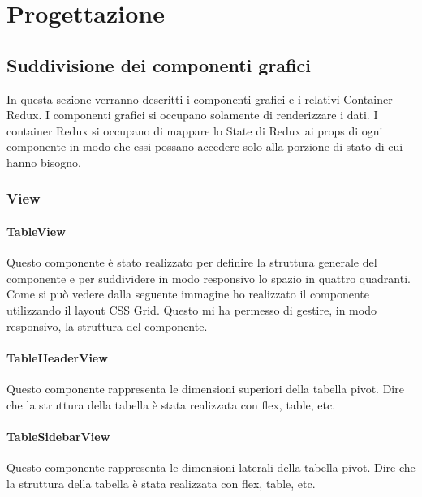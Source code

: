 
\chapter{Progettazione}
\label{cap:progettazione}

\section{Suddivisione dei componenti grafici}
In questa sezione verranno descritti i componenti grafici e i relativi Container Redux. I componenti grafici si occupano solamente di renderizzare i dati. I container Redux si occupano di mappare lo State di Redux ai props di ogni componente in modo che essi possano accedere solo alla porzione di stato di cui hanno bisogno.
\subsection{View}
\subsubsection{TableView}
Questo componente è stato realizzato per definire la struttura generale del componente e per suddividere in modo responsivo lo spazio in quattro quadranti. Come si può vedere dalla seguente immagine ho realizzato il componente utilizzando il layout CSS Grid. Questo mi ha permesso di gestire, in modo responsivo, la struttura del componente.

\subsubsection{TableHeaderView}
Questo componente rappresenta le dimensioni superiori della tabella pivot.
Dire che la struttura della tabella è stata realizzata con flex, table, etc.

\subsubsection{TableSidebarView}
Questo componente rappresenta le dimensioni laterali della tabella pivot.
Dire che la struttura della tabella è stata realizzata con flex, table, etc.

